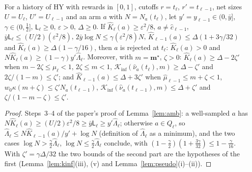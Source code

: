 \documentclass[11pt]{article}
\newcommand{\Kinf}{\mathcal K_{\inf}}
\begin{document}
\begin{lemma}[the consistency test when $x=1$, for one history]\label{flem:amb-hist}
For a history of HY with rewards in $[0,1]$, cutoffs $r=t_\ell$, $r'=t_{\ell-1}$, net sizes $U=U_\ell$,
$U'=U_{\ell-1}$ and an arm $a$ with $N=N_a(t_\ell)$, let $y'=y_{\ell-1}\in(0,\bar y]$, $\gamma\in(0,\frac12]$,
$\mathsf L_\ell\ge0$, $\varepsilon>0$, $\Delta\ge0$. If $\hat K_\ell(a)\ge\varepsilon^2/8$, $a\ne\hat c_{\ell-1}$,
$\bar y\mathsf L_\ell\le(U/2)(\varepsilon^2/8)$, $2\bar y\log N\le\gamma(\varepsilon^2/8)N$,
$\hat K_{\ell-1}(a)\le\Delta(1+3\gamma/32)$ and $\hat K_\ell(a)\ge\Delta(1-\gamma/16)$, then $a$ is rejected at $t_\ell$:
$\hat K_\ell(a)>0$ and $N\hat K_\ell(a)\ge(1-\gamma)y'\hat\Lambda_\ell$. Moreover, with $m=\mathbf m^\star$, $\zeta>0$:
$\hat K_\ell(a)\ge\Delta-2\zeta'$ when $m-2\zeta\le\hat\mu_\ell<1$, $2\zeta\le m<1$,
$\Kinf(\hat\nu_a(t_\ell),m)\ge\Delta-\zeta'$ and $2\zeta/(1-m)\le\zeta'$; and $\hat K_{\ell-1}(a)\le\Delta+3\zeta'$ when
$\hat\mu_{\ell-1}\le m+\zeta<1$, $w_0\kappa(m+\zeta)\le\zeta'N_a(t_{\ell-1})$, $\Kinf(\hat\nu_a(t_{\ell-1}),m)\le\Delta+\zeta'$
and $\zeta/(1-m-\zeta)\le\zeta'$.
\end{lemma}

\begin{proof}
Steps~3--4 of the paper's proof of Lemma~\ref{lem:amb}: a well-sampled $a$ has
$N\hat K_\ell(a)\ge(U/2)\varepsilon^2/8\ge\bar y\mathsf L_\ell\ge y'\hat\Lambda_\ell$; otherwise $a\in Q_\ell$, so
$\hat\Lambda_\ell\le N\hat K_{\ell-1}(a)/y'+\log N$ (definition of $\hat\Lambda_\ell$ as a minimum), and the two cases
$\log N>\frac\gamma2\hat\Lambda_\ell$, $\log N\le\frac\gamma2\hat\Lambda_\ell$ conclude, with
$(1-\frac\gamma2)(1+\frac{3\gamma}{32})\le1-\frac\gamma{16}$. With $\zeta'=\gamma\Delta/32$ the two bounds of the
second part are the hypotheses of the first (Lemma~\ref{lem:kinf}(iii), (v) and
Lemma~\ref{lem:pseudo}(i)--(ii)).
\end{proof}
\end{document}
